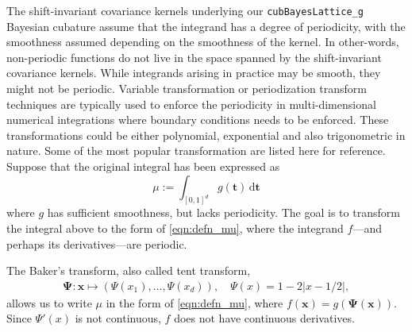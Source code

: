 \documentclass{iitthesis}          %
\newcommand{\bm}[1]{\boldsymbol{#1}}
\newcommand{\dif}[1]{\text{d}{#1}}
\newcommand{\vt}{\bm{t}}
\newcommand{\vx}{\bm{x}}
\newcommand{\vPsi}{\boldsymbol{\Psi}}
\newcommand{\code}[1]{\texttt{#1}}
\def\abs#1{\ensuremath{\left \lvert #1 \right \rvert}}
\begin{document}
The shift-invariant covariance kernels underlying our \code{cubBayesLattice\_g} \\
Bayesian cubature  assume that the integrand has a degree of periodicity, with the smoothness assumed depending on the smoothness of the kernel.  
In other-words, non-periodic functions do not live in the space spanned by the shift-invariant covariance kernels.
While integrands arising in practice may be smooth, they might not be periodic.  
Variable transformation or periodization transform techniques are typically used to enforce the periodicity in multi-dimensional numerical integrations where boundary conditions needs to be enforced. These transformations could be either polynomial, exponential and also trigonometric in nature.
Some of the most popular transformation are listed here for reference. 
Suppose that the original integral has been expressed as 
\begin{equation*}
\mu := \int_{[0,1]^d} g(\vt) \, \dif \vt
\end{equation*}
where $g$ has sufficient smoothness, but lacks periodicity.  
The goal is to transform the integral above to the form of \eqref{eqn:defn_mu}, where the integrand $f$---and perhaps its derivatives---are  periodic.  

The Baker's transform, also called tent transform,
\begin{align} \label{eq:bakerTrans}
\vPsi: \vx \mapsto (\Psi(x_1),  \ldots, \Psi(x_d)),  \quad \Psi(x)  =1 - 2 \abs{x - 1/2},
\end{align}
allows us to write $\mu$ in the form of \eqref{eqn:defn_mu}, where $f(\vx) = g(\vPsi(\vx))$.  
Since  $\Psi'(x)$ is not continuous, $f$ does not have continuous derivatives. 
\end{document}
